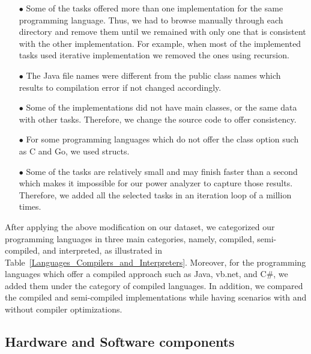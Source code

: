 \begin{enumerate}
	\item [$\bullet$] Some of the tasks offered more than one implementation 
	for the same programming language. 
	Thus, we had to browse manually through each directory and remove 
	them until we remained with only one that is consistent with the other 
	implementation. 
	For example, when most of the implemented tasks used iterative implementation 
	we removed the ones using recursion. 
	\item [$\bullet$] The Java file names were 
	different from the public class names which results to compilation 
	error if not changed accordingly. 
	\item [$\bullet$] Some of the implementations did not have main 
	classes, or the same data with other tasks. 
	Therefore, we change the source code to offer consistency.
	\item [$\bullet$] For some programming languages which do not offer 
	the class option such as C and Go, we used structs. 
	\item [$\bullet$] Some of the tasks are relatively small and may 
	finish faster than a second which makes it impossible for our 
	power analyzer to capture those results. 
	Therefore, we added all the selected tasks in an iteration loop of 
	a million times. 
\end{enumerate}

After applying the above modification on our dataset, we categorized our 
programming languages in three main categories, namely, compiled, semi-compiled, and interpreted, as illustrated in 
Table~\ref{Languages_Compilers_and_Interpreters}. 
Moreover, for the programming languages which offer a compiled approach 
such as Java, {\sc vb.net}, and C\#, we added them under the category of 
compiled languages. 
In addition, we compared the compiled and semi-compiled implementations while 
having scenarios with and without compiler optimizations.




\subsection{Hardware and Software components}

